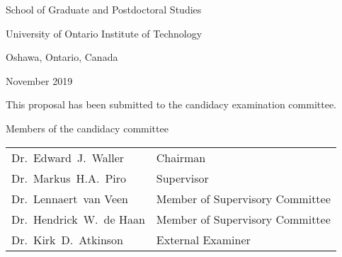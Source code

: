 \begin{titlepage}
\begin{center}
School of Graduate and Postdoctoral Studies

University of Ontario Institute of Technology

Oshawa, Ontario, Canada

November 2019


\vspace*{2\bigskipamount}

\end{center}

\clearpage
\thispagestyle{empty}

\noindent This proposal has been submitted to the candidacy examination committee.


\bigskip
\noindent Members of the candidacy committee

%
\medskip\noindent
\begin{tabular}{p{5cm}l}
%    
%
    Dr.\ Edward\ J.\ Waller & Chairman \\
    Dr.\ Markus\ H.A.\ Piro & Supervisor \\
    Dr.\ Lennaert\ van Veen & Member of Supervisory Committee \\
    Dr.\ Hendrick\ W.\ de Haan & Member of Supervisory Committee \\
    Dr.\ Kirk\ D.\ Atkinson & External Examiner
%    
%
\end{tabular}



\end{titlepage}

